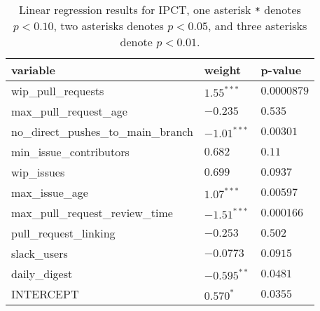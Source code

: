 \renewcommand{\arraystretch}{1.2}
\begin{table}
\begin{center}
\begin{tabular}{|p{6cm}|p{4cm}|p{4cm}|} 
\hline
variable & weight & p-value \\ [0.5ex]
\hline\hline

wip\_pull\_requests & $1.55^{***}$ & $0.0000879$ \\
max\_pull\_request\_age & $-0.235^{}$ & $0.535$ \\
no\_direct\_pushes\_to\_main\_branch & $-1.01^{***}$ & $0.00301$ \\
min\_issue\_contributors & $0.682^{}$ & $0.11$ \\
wip\_issues & $0.699^{}$ & $0.0937$ \\
max\_issue\_age & $1.07^{***}$ & $0.00597$ \\
max\_pull\_request\_review\_time & $-1.51^{***}$ & $0.000166$ \\
pull\_request\_linking & $-0.253^{}$ & $0.502$ \\
slack\_users & $-0.0773^{}$ & $0.0915$ \\
daily\_digest & $-0.595^{**}$ & $0.0481$ \\

\hline\hline
INTERCEPT & $0.570^{*}$ & $0.0355$ \\ 

\hline
\end{tabular}
\caption{Linear regression results for IPCT, one asterisk \texttt{*} denotes  $p < 0.10$, two asterisks denotes $p < 0.05$, and three asterisks denote $p < 0.01$.}
\label{tab:lmipResults}
\end{center}
\end{table}